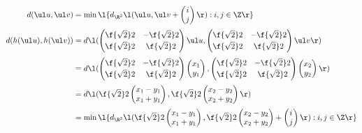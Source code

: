 \documentclass[a4paper]{article}
\begin{document}
\begin{align*}
d(\ul u, \ul v) &= \min\l\{ d_{\R^2} \l( \ul u, \ul v + \begin{pmatrix} i \\ j \end{pmatrix} \r)
    : i, j \in \Z \r\} \\[0.5ex]
%
d(h(\ul u), h(\ul v)) &= d \l(
    \begin{pmatrix} \f{\sqrt 2}2 & -\f{\sqrt 2}2 \\[0.5ex] \f{\sqrt 2}2 & \f{\sqrt 2}2 \end{pmatrix} \ul u,
    \begin{pmatrix} \f{\sqrt 2}2 & -\f{\sqrt 2}2 \\[0.5ex] \f{\sqrt 2}2 & \f{\sqrt 2}2 \end{pmatrix} \ul v
\r) \\[0.5ex]
%
&= d \l(
    \begin{pmatrix} \f{\sqrt 2}2 & -\f{\sqrt 2}2 \\[0.5ex] \f{\sqrt 2}2 & \f{\sqrt 2}2 \end{pmatrix}
    \begin{pmatrix} x_1 \\ y_1 \end{pmatrix},
    \begin{pmatrix} \f{\sqrt 2}2 & -\f{\sqrt 2}2 \\[0.5ex] \f{\sqrt 2}2 & \f{\sqrt 2}2 \end{pmatrix}
    \begin{pmatrix} x_2 \\ y_2 \end{pmatrix}
\r) \\[0.5ex]
%
&= d \l(
    \f{\sqrt 2}2 \begin{pmatrix} x_1 - y_1 \\ x_1 + y_1 \end{pmatrix},
    \f{\sqrt 2}2 \begin{pmatrix} x_2 - y_2 \\ x_2 + y_2 \end{pmatrix}
\r) \\[0.5ex]
%
&= \min\l\{ d_{\R^2} \l(
    \f{\sqrt 2}2 \begin{pmatrix} x_1 - y_1 \\ x_1 + y_1 \end{pmatrix},
    \f{\sqrt 2}2 \begin{pmatrix} x_2 - y_2 \\ x_2 + y_2 \end{pmatrix} + \begin{pmatrix} i \\ j \end{pmatrix}
\r) : i, j \in \Z \r\} \\[0.5ex]
\end{align*}
\end{document}
